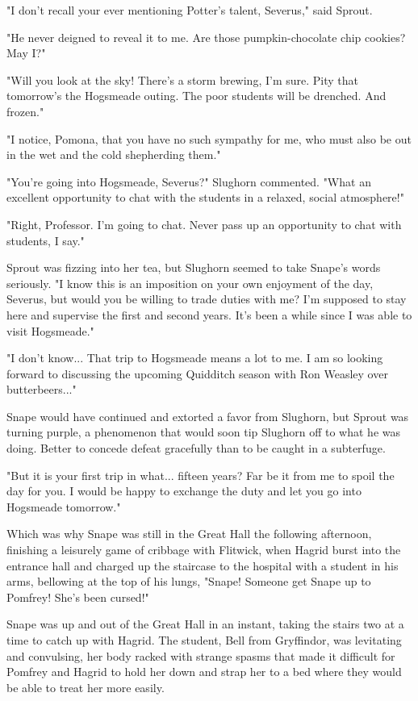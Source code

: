 \documentclass[a4paper,11pt]{article}
\begin{document}
"I don't recall your ever mentioning Potter's talent, Severus," said Sprout.

"He never deigned to reveal it to me. Are those pumpkin-chocolate chip cookies? May I?"

"Will you look at the sky! There's a storm brewing, I'm sure. Pity that tomorrow's the Hogsmeade outing. The poor students will be drenched. And frozen."

"I notice, Pomona, that you have no such sympathy for me, who must also be out in the wet and the cold shepherding them."

"You're going into Hogsmeade, Severus?" Slughorn commented. "What an excellent opportunity to chat with the students in a relaxed, social atmosphere!"

"Right, Professor. I'm going to chat. Never pass up an opportunity to chat with students, I say."

Sprout was fizzing into her tea, but Slughorn seemed to take Snape's words seriously. "I know this is an imposition on your own enjoyment of the day, Severus, but would you be willing to trade duties with me? I'm supposed to stay here and supervise the first and second years. It's been a while since I was able to visit Hogsmeade."

"I don't know... That trip to Hogsmeade means a lot to me. I am so looking forward to discussing the upcoming Quidditch season with Ron Weasley over butterbeers..."

Snape would have continued and extorted a favor from Slughorn, but Sprout was turning purple, a phenomenon that would soon tip Slughorn off to what he was doing. Better to concede defeat gracefully than to be caught in a subterfuge.

"But it is your first trip in what... fifteen years? Far be it from me to spoil the day for you. I would be happy to exchange the duty and let you go into Hogsmeade tomorrow."

Which was why Snape was still in the Great Hall the following afternoon, finishing a leisurely game of cribbage with Flitwick, when Hagrid burst into the entrance hall and charged up the staircase to the hospital with a student in his arms, bellowing at the top of his lungs, "Snape! Someone get Snape up to Pomfrey! She's been cursed!"

Snape was up and out of the Great Hall in an instant, taking the stairs two at a time to catch up with Hagrid. The student, Bell from Gryffindor, was levitating and convulsing, her body racked with strange spasms that made it difficult for Pomfrey and Hagrid to hold her down and strap her to a bed where they would be able to treat her more easily.
\end{document}
